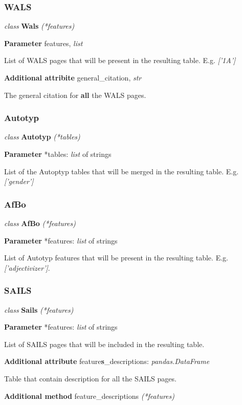 \documentclass[a4paper,12pt]{article}
\begin{document}
\subsubsection{WALS}

\textit{class} \textbf{Wals} \textit{(*features)}
\medskip

\textbf{Parameter} features, \textit{list}

List of WALS pages that will be present in the resulting table. E.g. \textit{['1A']}
\medskip

\textbf{Additional attribite} general\_citation, \textit{str}

The general citation for \textbf{all} the WALS pages.

\subsubsection{Autotyp}

\textit{class} \textbf{Autotyp} \textit{(*tables)}
\medskip

\textbf{Parameter} *tables: \textit{list} of strings

List of the Autoptyp tables that will be merged in the resulting table. E.g. \textit{['gender']}

\subsubsection{AfBo}
\textit{class} \textbf{AfBo} \textit{(*features)}
\medskip

\textbf{Parameter} *features: \textit{list} of strings

List of Autotyp features that will be present in the resulting table. E.g. \textit{['adjectivizer']}.

\subsubsection{SAILS}

\textit{class} \textbf{Sails} \textit{(*features)}
\medskip

\textbf{Parameter} *features: \textit{list} of strings

List of SAILS pages that will be included in the resulting table.
\medskip

\textbf{Additional attribute} feature\textbf{s}\_descriptions: \textit{pandas.DataFrame}

Table that contain description for all the SAILS pages.
\medskip

\textbf{Additional method} feature\_descriptions \textit{(*features)}
\end{document}
